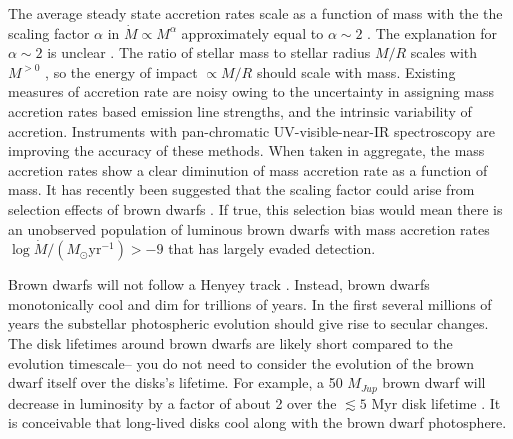 \documentclass[12pt,preprint]{aastex}
\begin{document}
The average steady state accretion rates scale as a function of mass with the the scaling factor $\alpha$ in $\dot{M}\propto M^\alpha$ approximately equal to $\alpha \sim 2$ \citep{2008A&A...481..423G, 2006ApJ...639L..83A,2006A&A...452..245N,2009ApJ...696.1589H}.  The explanation for $\alpha \sim 2$ is unclear \citep{2006ApJ...648..484H}.  The ratio of stellar mass to stellar radius $M/R$ scales with $M^{>0}$ \citep{2009AIPC.1094..102C}, so the energy of impact $\propto M/R$ should scale with mass.  Existing measures of accretion rate are noisy owing to the uncertainty in assigning mass accretion rates based emission line strengths, and the intrinsic variability of accretion.  Instruments with pan-chromatic UV-visible-near-IR spectroscopy \citep{2011A&A...536A.105V,2012A&A...548A..56R} are improving the accuracy of these methods.  When taken in aggregate, the mass accretion rates show a clear diminution of mass accretion rate as a function of mass.  It has recently been suggested that the scaling factor could arise from selection effects of brown dwarfs \citep{2010MNRAS.409.1307M}.  If true, this selection bias would mean there is an unobserved population of luminous brown dwarfs with mass accretion rates $\log{\dot{M}/(M_{\odot}\mathrm{yr}^{-1})} >-9$ that has largely evaded detection.

Brown dwarfs will not follow a Henyey track \citep{1959ApJ...129....2H}.  Instead, brown dwarfs monotonically cool and dim for trillions of years.  In the first several millions of years the substellar photospheric evolution should give rise to secular changes.  The disk lifetimes around brown dwarfs are likely short compared to the evolution timescale-- you do not need to consider the evolution of the brown dwarf itself over the disks's lifetime.  For example, a 50 $M_{Jup}$ brown dwarf will decrease in luminosity by a factor of about 2 over the $\lesssim5$ Myr disk lifetime \citep{2002A&A...382..563B}.  It is conceivable that long-lived disks cool along with the brown dwarf photosphere.
\end{document}

